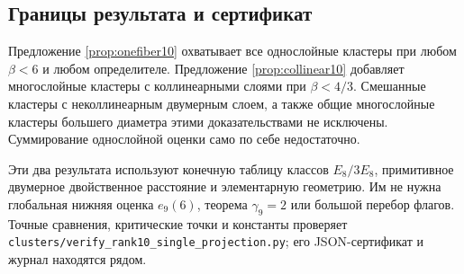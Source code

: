 \documentclass[11pt,a4paper]{article}
\theoremstyle{remark}\newtheorem{remark}[theorem]{Замечание}
\newcommand{\file}[1]{{\small\nolinkurl{#1}}}
\begin{document}
\subsection{Границы результата и сертификат}

Предложение \ref{prop:onefiber10} охватывает все однослойные кластеры при любом $\beta<6$ и любом определителе. Предложение \ref{prop:collinear10} добавляет многослойные кластеры с коллинеарными слоями при $\beta<4/3$. Смешанные кластеры с неколлинеарным двумерным слоем, а также общие многослойные кластеры большего диаметра этими доказательствами не исключены. Суммирование однослойной оценки само по себе недостаточно.

Эти два результата используют конечную таблицу классов $E_8/3E_8$, примитивное двумерное двойственное расстояние и элементарную геометрию. Им не нужна глобальная нижняя оценка $e_9(6)$, теорема $\gamma_9=2$ или большой перебор флагов. Точные сравнения, критические точки и константы проверяет \file{clusters/verify_rank10_single_projection.py}; его JSON-сертификат и журнал находятся рядом.
\end{document}
